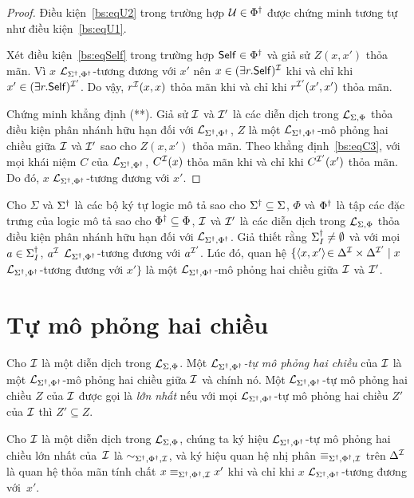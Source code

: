 \begin{proof}
	\semiItem Điều kiện~\eqref{bs:eqU2} trong trường hợp $\mathcal{U} \in \Phi^\dag$ được chứng minh tương tự như điều kiện~\eqref{bs:eqU1}.
	
	\semiItem Xét điều kiện~\eqref{bs:eqSelf} trong trường hợp $\mathsf{Self} \in \Phi^\dag$ và giả sử $Z(x,x')$ thỏa mãn. Vì $x$ $\mathcal{L}_{\Sigma^\dag,\Phi^\dag}$-tương đương với $x'$ nên $x \in (\exists r.\mathsf{Self})^{\mathcal{I}}$ khi và chỉ khi $x' \in (\exists r.\mathsf{Self})^{\mathcal{I}'}$. Do vậy, $r^{\mathcal{I}}(x,x)$ thỏa mãn khi và chỉ khi $r^{\mathcal{I}'}(x',x')$ thỏa mãn.
	
	Chứng minh khẳng định (**). Giả sử $\mathcal{I}$ và $\mathcal{I}'$ là các diễn dịch trong $\mathcal{L}_{\Sigma,\Phi}$ thỏa điều kiện phân nhánh hữu hạn đối với $\mathcal{L}_{\Sigma^\dag,\Phi^\dag}$, $Z$ là một $\mathcal{L}_{\Sigma^\dag,\Phi^\dag}$-mô phỏng hai chiều giữa $\mathcal{I}$ và $\mathcal{I}'$ sao cho $Z(x,x')$ thỏa mãn. Theo khẳng định~\eqref{bs:eqC3}, với mọi khái niệm $C$ của $\mathcal{L}_{\Sigma^\dag,\Phi^\dag}$, $C^{\mathcal{I}}(x)$ thỏa mãn khi và chỉ khi $C^{\mathcal{I}'}(x')$ thỏa mãn. Do đó, $x$ $\mathcal{L}_{\Sigma^\dag,\Phi^\dag}$-tương đương với $x'$.
\end{proof}

\begin{Corollary}
\label{co:EquivalenceRelation}
	Cho $\Sigma$ và $\Sigma^\dag$ là các bộ ký tự logic mô tả sao cho $\Sigma^\dag \subseteq \Sigma$, $\Phi$ và $\Phi^\dag$ là tập các đặc trưng của logic mô tả sao cho $\Phi^\dag \subseteq \Phi$, $\mathcal{I}$ và $\mathcal{I}'$ là các diễn dịch trong $\mathcal{L}_{\Sigma,\Phi}$ thỏa điều kiện phân nhánh hữu hạn đối với $\mathcal{L}_{\Sigma^\dag,\Phi^\dag}$. Giả thiết rằng $\Sigma^\dag_I \not= \emptyset$ và với mọi $a \in \Sigma^\dag_I$, $a^{\mathcal{I}}$ $\mathcal{L}_{\Sigma^\dag,\Phi^\dag}$-tương đương với $a^{\mathcal{I}'}$.
	Lúc đó, quan hệ $\{\left\langle x, x'\right\rangle\! \in \Delta^{\mathcal{I}} \times \Delta^{\mathcal{I}'} \mid x $ $\mathcal{L}_{\Sigma^\dag,\Phi^\dag}$-tương đương với $x'\}$ là một $\mathcal{L}_{\Sigma^\dag,\Phi^\dag}$-mô phỏng hai chiều giữa $\mathcal{I}$ và $\mathcal{I}'$.\myend
\end{Corollary}

\section{Tự mô phỏng hai chiều}
\label{sec:Chap2.AutoBisimulation}

\begin{Definition}
\label{def:AutoBisimulation}
	Cho $\mathcal{I}$ là một diễn dịch trong $\mathcal{L}_{\Sigma,\Phi}$. Một {\em $\mathcal{L}_{\Sigma^\dag,\Phi^\dag}$-tự mô phỏng hai chiều} của $\mathcal{I}$ là một $\mathcal{L}_{\Sigma^\dag,\Phi^\dag}$-mô phỏng hai chiều giữa $\mathcal{I}$ và chính nó. Một $\mathcal{L}_{\Sigma^\dag,\Phi^\dag}$-tự mô phỏng hai chiều $Z$ của $\mathcal{I}$ được gọi là {\em lớn nhất} nếu với mọi $\mathcal{L}_{\Sigma^\dag,\Phi^\dag}$-tự mô phỏng hai chiều $Z'$ của $\mathcal{I}$ thì $Z' \subseteq Z$.\myend
\end{Definition}

Cho $\mathcal{I}$ là một diễn dịch trong $\mathcal{L}_{\Sigma,\Phi}$, chúng ta ký hiệu $\mathcal{L}_{\Sigma^\dag,\Phi^\dag}$-tự mô phỏng hai chiều lớn nhất của~$\mathcal{I}$ là $\sim_{\Sigma^\dag,\Phi^\dag,\mathcal{I}}$, và ký hiệu quan hệ nhị phân $\equiv_{\Sigma^\dag,\Phi^\dag,\mathcal{I}}$ trên $\Delta^{\mathcal{I}}$ là quan hệ thỏa mãn tính chất $x \equiv_{\Sigma^\dag,\Phi^\dag,\mathcal{I}} x'$ khi và chỉ khi $x$ $\mathcal{L}_{\Sigma^\dag,\Phi^\dag}$-tương đương với~$x'$.

